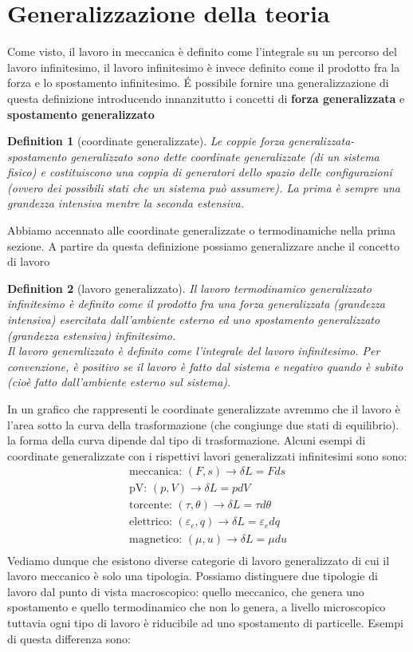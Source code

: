 \documentclass[10pt,a4paper]{article}
\newtheorem{definition}{Definition}
\begin{document}
\section{Generalizzazione della teoria}
Come visto, il lavoro in meccanica è definito come l'integrale su un percorso del lavoro infinitesimo, il lavoro infinitesimo è invece definito come il prodotto fra la forza e lo spostamento infinitesimo. \'{E} possibile fornire una generalizzazione di questa definizione introducendo innanzitutto i concetti di \textbf{forza generalizzata} e \textbf{spostamento generalizzato}
\begin{definition}[coordinate generalizzate]
	Le coppie forza generalizzata-spostamento generalizzato sono dette coordinate generalizzate (di un sistema fisico) e costituiscono una coppia di generatori dello spazio delle configurazioni (ovvero dei possibili stati che un sistema può assumere). La prima è sempre una grandezza intensiva mentre la seconda estensiva.
\end{definition}
Abbiamo accennato alle coordinate generalizzate o termodinamiche nella prima sezione. A partire da questa definizione possiamo generalizzare anche il concetto di lavoro
\begin{definition}[lavoro generalizzato]
	Il lavoro termodinamico generalizzato infinitesimo è definito come il prodotto fra una forza generalizzata (grandezza intensiva) esercitata dall'ambiente esterno ed uno spostamento generalizzato (grandezza estensiva) infinitesimo.\\
	Il lavoro generalizzato è definito come l'integrale del lavoro infinitesimo. 
	Per convenzione, è positivo se il lavoro è fatto dal sistema e negativo quando è subito (cioè fatto dall'ambiente esterno sul sistema). 
\end{definition}
In un grafico che rappresenti le coordinate generalizzate avremmo che il lavoro è l'area sotto la curva della trasformazione (che congiunge due stati di equilibrio). la forma della curva dipende dal tipo di trasformazione.  
Alcuni esempi di coordinate generalizzate con i rispettivi lavori generalizzati infinitesimi sono sono:
\begin{align*}
	\text{meccanica: }(F, s)\rightarrow\delta L = F ds\\ 
	\text{pV: }(p, V)\rightarrow\delta L=p dV\\
	\text{torcente: }(\tau, \theta)\rightarrow\delta L=\tau d\theta\\
	\text{elettrico: }(\varepsilon_e, q)\rightarrow\delta L=\varepsilon_edq\\
	\text{magnetico: }(\mu, u)\rightarrow\delta L=\mu du\\
\end{align*}
Vediamo dunque che esistono diverse categorie di lavoro generalizzato di cui il lavoro meccanico è solo una tipologia. Possiamo distinguere due tipologie di lavoro dal punto di vista macroscopico: quello meccanico, che genera uno spostamento e quello termodinamico che non lo genera, a livello microscopico tuttavia ogni tipo di lavoro è riducibile ad uno spostamento di particelle. Esempi di questa differenza sono:
\end{document}
